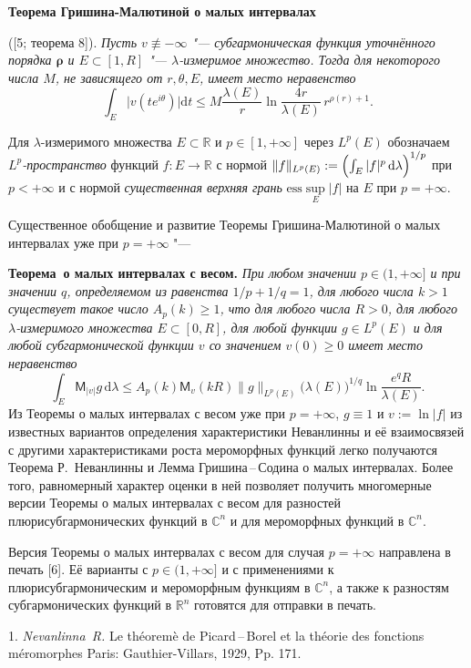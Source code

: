  \noindent
{\bf Теорема Гришина\--Малютиной о малых интервалах} {\rm ([5; теорема 8]). {\it Пусть $v\not\equiv -\infty$ "--- субгармоническая функция уточнённого порядка $\mathbf{\rho}$ и $E\subset [1,R]$ "--- $\lambda$-измеримое множество. Тогда для некоторого числа $M$, не зависящего от $r, \theta, E$, имеет место неравенство
$$
\int_{E} \bigl|v(te^{i\theta})\bigr| \mathrm{d} t\leq
M\frac{\lambda( E)}{r}\ln
\frac{4r}{\lambda( E)}\, r^{\rho(r)+1}.
$$
}

Для $\lambda$-измеримого множества $E\subset \mathbb R$ и $p\in [1,+\infty]$
через $L^p(E)$ обозначаем \textit{$L^p$-пространство\/} функций $f\colon E\to \mathbb R$ с нормой $\|f\|_{L^p(E)}:=\Bigl(\int_E|f|^p\,\mathrm{d}\lambda\Bigr)^{1/p}$ при $p<+\infty$ и с нормой \textit{существенная верхняя грань\/} $\mathrm{ess}\sup\limits_E |f|$ на $E$ при $p=+\infty$.

Существенное обобщение и развитие Теоремы Гришина\--Малютиной о малых интервалах уже при $p=+\infty$ "---

\noindent
\textbf{Теорема~о малых интервалах с весом.} {\it При любом значении $p\in (1,+\infty]$ и при значении $q$, определяемом из равенства $1/p+1/q=1$, для любого числа $k>1$ существует такое число $A_p(k)\geq 1$, что
для любого числа $R> 0$, для любого $\lambda$-измеримого множества $E\subset [0,R]$, для любой функции $g\in L^p(E)$ и для любой субгармонической функции $v$ со значением $v(0)\geq 0$ имеет место неравенство
$$
\int_E\mathsf{M}_{|v|}g\,\mathrm{d} \lambda \leq A_p(k)\mathsf{M}_{v}(kR)
\|g\|_{L^p(E)}\bigl(\lambda(E)\bigr)^{1/q}\ln \frac{e^qR}{\lambda(E)}.
$$
}
Из Теоремы о малых интервалах с весом уже при $p=+\infty$, $g\equiv 1$ и $v:=\ln |f|$ из известных вариантов определения характеристики Неванлинны и её взаимосвязей с другими характеристиками роста мероморфных функций легко получаются Теорема Р.~Неванлинны и Лемма Гришина\,--\,Содина о малых интервалах. Более того, равномерный характер оценки в ней позволяет получить многомерные версии Теоремы о малых интервалах с весом для разностей плюрисубгармонических функций в $\mathbb C^n$ и для мероморфных функций в $\mathbb C^n$.

Версия Теоремы о малых интервалах с весом для случая $p=+\infty$ направлена
в печать [6]. Её варианты с $p\in (1,+\infty]$ и с применениями к плюрисубгармоническим и мероморфным функциям в $\mathbb C^n$, а также
к разностям субгармонических функций в $\mathbb R^n$ готовятся для отправки в печать.

\litlist

1. {\it Nevanlinna~R.\/}
 Le th\'eorem\`e de Picard\,--\,Borel et la th\'eorie des fonctions m\'eromorphes
 Paris: Gauthier-Villars, 1929, Pp. 171.

}
